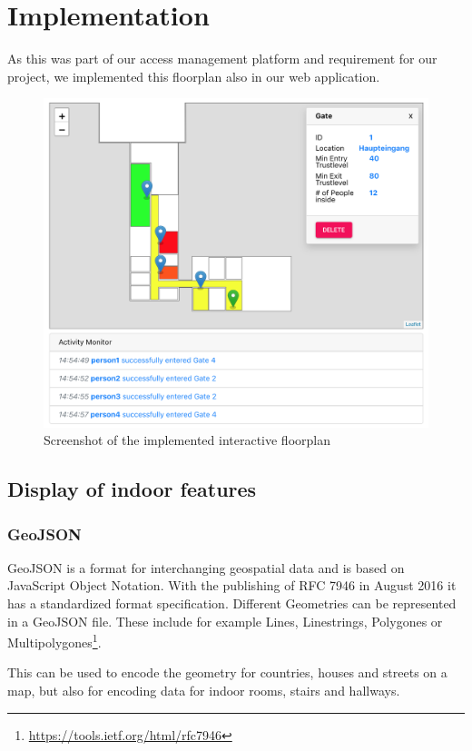 \section{Implementation}
As this was part of our access management platform and requirement for our project, we implemented this floorplan also in our web application.

\begin{figure}[!hb]
	\centering
	\includegraphics[width=0.9\linewidth]{images/FloorplanScreenshot}
	\caption{Screenshot of the implemented interactive floorplan}
	\label{fig:FloorplanScreenshot}
\end{figure}

\subsection{Display of indoor features}
\label{Display of indoor features}

\subsubsection{GeoJSON}
\label{GeoJSON}

GeoJSON is a format for interchanging geospatial data and is based on JavaScript Object Notation. With the publishing of RFC 7946 in August 2016 it has a standardized format specification.
Different Geometries can be represented in a GeoJSON file. These include for example Lines, Linestrings, Polygones or Multipolygones\footnote{\url{https://tools.ietf.org/html/rfc7946}}. 

This can be used to encode the geometry for countries, houses and streets on a map, but also for encoding data for indoor rooms, stairs and hallways.


